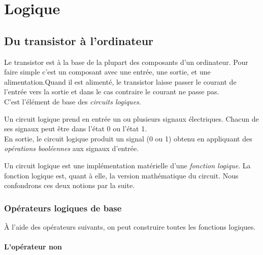 \chapter{Logique}
\section{Du transistor à l'ordinateur}

Le transistor est à la base de la plupart des composants d'un ordinateur. Pour faire simple c'est un composant avec une entrée, une sortie, et une alimentation.Quand il est alimenté, le transistor laisse passer le courant de l'entrée vers la sortie et dans le cas contraire le courant ne passe pas.\\
C'est l'élément de base des \textit{circuits logiques}.
\begin{definition}
    Un circuit logique prend en entrée un ou plusieurs signaux électriques. Chacun de ses signaux peut être dans l'état 0 ou l'état 1.\\
    En sortie, le circuit logique produit un signal (0 ou 1) obtenu en appliquant des \textit{opérations booléennes} aux signaux d'entrée.
\end{definition}

Un circuit logique est une implémentation matérielle d'une \textit{fonction logique}. La fonction logique est, quant à elle, la version \og mathématique\fg{} du circuit. Nous confondrons ces deux notions par la suite.

\subsection{Opérateurs logiques de base}

À l'aide des opérateurs suivants, on peut construire toutes les fonctions logiques.

\subsubsection*{L'opérateur \og non\fg{}}

